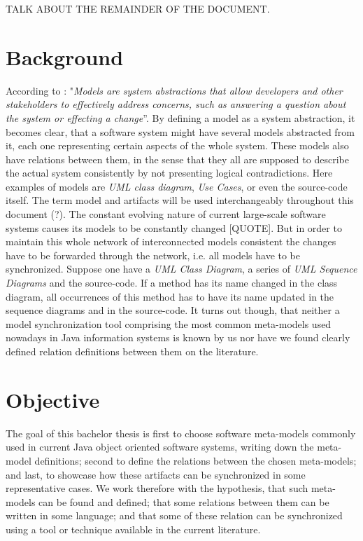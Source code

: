 \documentclass[tuberlin,cic,tc,openright,english,noabntcite]{iiufrgs}
\begin{document}
TALK ABOUT THE REMAINDER OF THE DOCUMENT.

\section{Background}
According to \citet[p. 21]{czarnecki2006feature}: "\textit{Models are system abstractions that allow developers and other stakeholders to effectively address concerns, such as answering a question about the system or effecting a change}”. By defining a model as a system abstraction, it becomes clear, that a software system might have several models abstracted from it, each one representing certain aspects of the whole system. These models also have relations between them, in the sense that they all are supposed to describe the actual system consistently by not presenting logical contradictions. Here examples of models are \emph{UML class diagram}, \emph{Use Cases}, or even the source-code itself. The term model and artifacts will be used interchangeably throughout this document (?).
The constant evolving nature of current large-scale software systems causes its models to be constantly changed [QUOTE]. But in order to maintain this whole network of interconnected models consistent the changes have to be forwarded through the network, i.e. all models have to be synchronized. Suppose one have a \emph{UML Class Diagram}, a series of \emph{UML Sequence Diagrams} and the source-code. If a method has its name changed in the class diagram, all occurrences of this method has to have its name updated in the sequence diagrams and in the source-code. It turns out though, that neither a model synchronization tool comprising the most common meta-models used nowadays in Java information systems is known by us nor have we found clearly defined relation definitions between them on the literature. 

\section{Objective}
The goal of this bachelor thesis is first to choose software meta-models commonly used in current Java object oriented software systems, writing down the meta-model definitions; second to define the relations between the chosen meta-models; and last, to showcase how these artifacts can be synchronized in some representative cases. We work therefore with the hypothesis, that such meta-models can be found and defined; that some relations between them can be written in some language; and that some of these relation can be synchronized using a tool or technique available in the current literature.
\end{document}
